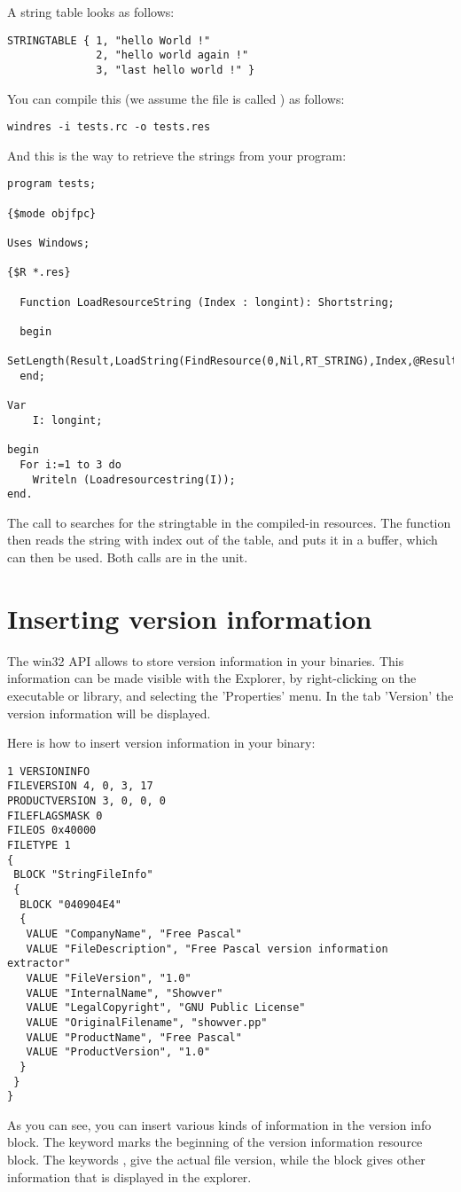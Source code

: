 A string table looks as follows:
\begin{verbatim}
STRINGTABLE { 1, "hello World !"
              2, "hello world again !"
              3, "last hello world !" }
\end{verbatim}
You can compile this (we assume the file is called ) as
follows:
\begin{verbatim}
windres -i tests.rc -o tests.res
\end{verbatim}
And this is the way to retrieve the strings from your program:
\begin{verbatim}
program tests;

{$mode objfpc}

Uses Windows;

{$R *.res}

  Function LoadResourceString (Index : longint): Shortstring;

  begin
    SetLength(Result,LoadString(FindResource(0,Nil,RT_STRING),Index,@Result[1],SizeOf(Result)))
  end;

Var
    I: longint;

begin
  For i:=1 to 3 do
    Writeln (Loadresourcestring(I));
end.
\end{verbatim}
The call to  searches for the stringtable in the
compiled-in resources. The  function then reads the
string with index  out of the table, and puts it in a buffer,
which can then be used. Both calls are in the  unit.

\section{Inserting version information}

The win32 API allows to store version information in your binaries.
This information can be made visible with the \windows Explorer, by
right-clicking on the executable or library, and selecting the
'Properties' menu. In the tab 'Version' the version information will
be displayed.

Here is how to insert version information in your binary:
\begin{verbatim}
1 VERSIONINFO
FILEVERSION 4, 0, 3, 17
PRODUCTVERSION 3, 0, 0, 0
FILEFLAGSMASK 0
FILEOS 0x40000
FILETYPE 1
{
 BLOCK "StringFileInfo"
 {
  BLOCK "040904E4"
  {
   VALUE "CompanyName", "Free Pascal"
   VALUE "FileDescription", "Free Pascal version information extractor"
   VALUE "FileVersion", "1.0"
   VALUE "InternalName", "Showver"
   VALUE "LegalCopyright", "GNU Public License"
   VALUE "OriginalFilename", "showver.pp"
   VALUE "ProductName", "Free Pascal"
   VALUE "ProductVersion", "1.0"
  }
 }
}
\end{verbatim}
As you can see, you can insert various kinds of information in the version info
block. The keyword  marks the beginning of the version
information resource block. The keywords ,
 give the actual file version, while the block
 gives other information that is displayed in the
explorer.

